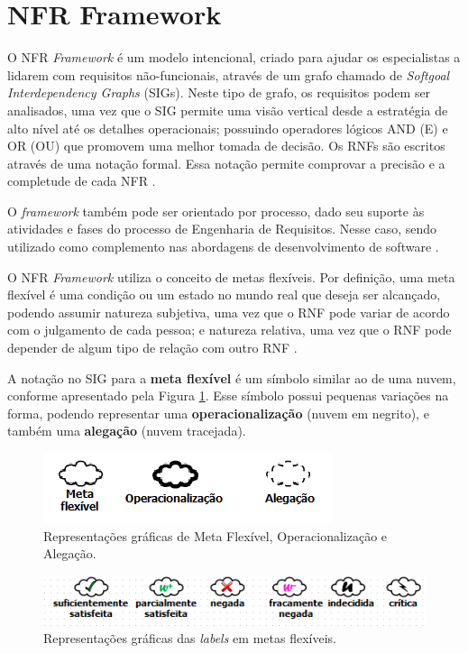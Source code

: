 \section{NFR Framework}
\label{sec:NFR}

O NFR \textit{Framework}  é um modelo intencional, criado para ajudar os especialistas a lidarem com requisitos não-funcionais, através de um grafo chamado de \textit{Softgoal Interdependency Graphs} (SIGs). Neste tipo de grafo, os requisitos podem ser analisados, uma vez que o SIG permite uma visão vertical desde a estratégia de alto nível até os detalhes operacionais;  possuindo operadores lógicos AND (E) e OR (OU) que promovem uma melhor tomada de decisão. Os RNFs são escritos através de uma notação formal. Essa notação permite comprovar a precisão e a completude de cada NFR \cite{chung2012non}. 

O \textit{framework} também pode ser orientado por processo, dado seu suporte às atividades e fases do processo de Engenharia de Requisitos. Nesse caso, sendo utilizado como complemento nas abordagens de desenvolvimento de software \cite{chung2012non}.

O NFR \textit{Framework} utiliza o conceito de metas  flexíveis. Por definição, uma meta flexível é uma condição ou um estado no mundo real que deseja ser alcançado, podendo assumir natureza subjetiva, uma vez que o RNF pode variar de acordo com o julgamento de cada pessoa; e natureza relativa, uma vez que o RNF pode depender de algum tipo de relação com outro RNF \cite{chung2012non}.

A notação no SIG para a \textbf{meta flexível} é um símbolo similar ao de uma nuvem, conforme apresentado pela Figura \ref{fig01}. Esse símbolo possui pequenas variações na forma, podendo representar uma \textbf{operacionalização} (nuvem em negrito), e também uma \textbf{alegação} (nuvem tracejada). 

\begin{figure}[h!]
	\centering
	\includegraphics[keepaspectratio=true,scale=0.9]{figuras/elementosSIG.png}
	\caption{Representações gráficas de Meta Flexível, Operacionalização e Alegação.}
	\label{fig01}
\end{figure} 

\begin{figure}[h]
	\centering
	\includegraphics[keepaspectratio=true,scale=0.9]{figuras/labelsSoftgoalsold.PNG}
	\caption{Representações gráficas das \textit{labels} em metas flexíveis.}
	\label{fig02}
\end{figure} 

